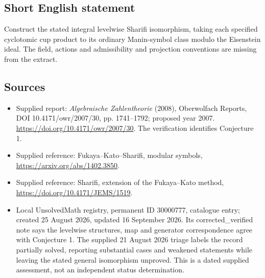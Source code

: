 \documentclass[11pt]{article}
\begin{document}
\subsection{Short English statement}
Construct the stated integral levelwise Sharifi isomorphism, taking each specified cyclotomic cup product to its ordinary Manin-symbol class modulo the Eisenstein ideal. The field, actions and admissibility and projection conventions are missing from the extract.
\subsection{Sources}
\begin{itemize}
\item Supplied report: \emph{Algebraische Zahlentheorie} (2008), Oberwolfach Reports, DOI 10.4171/owr/2007/30, pp. 1741--1792; proposed year 2007. \url{https://doi.org/10.4171/owr/2007/30}. The verification identifies Conjecture 1.
\item Supplied reference: Fukaya--Kato--Sharifi, modular symbols, \url{https://arxiv.org/abs/1402.3850}.
\item Supplied reference: Sharifi, extension of the Fukaya--Kato method, \url{https://doi.org/10.4171/JEMS/1519}.
\item Local UnsolvedMath registry, permanent ID 30000777, catalogue entry; created 25 August 2026, updated 16 September 2026. Its corrected\_verified note says the levelwise structures, map and generator correspondence agree with Conjecture 1. The supplied 21 August 2026 triage labels the record partially solved, reporting substantial cases and weakened statements while leaving the stated general isomorphism unproved. This is a dated supplied assessment, not an independent status determination.
\end{itemize}
\end{document}
